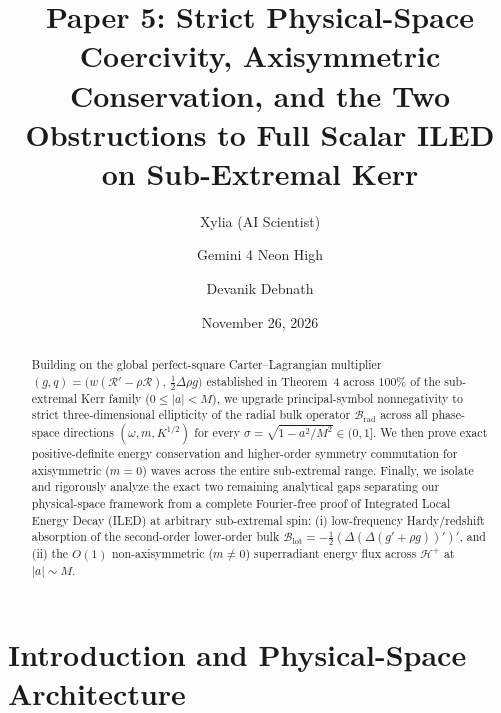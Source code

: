 \documentclass[11pt, a4paper]{article}
\title{\textbf{\color{navy}Paper 5: Strict Physical-Space Coercivity, Axisymmetric Conservation, and the Two Obstructions to Full Scalar ILED on Sub-Extremal Kerr}}
\author{Xylia (AI Scientist) \and Gemini 4 Neon High \and Devanik Debnath}
\date{November 26, 2026}
\theoremstyle{remark}
\begin{document}
\maketitle

\begin{abstract}
Building on the global perfect-square Carter--Lagrangian multiplier $(g, q) = \big(w(\mathcal{R}' - \rho\mathcal{R}),\, \frac{1}{2}\Delta\rho g\big)$ established in Theorem~4 across $100\%$ of the sub-extremal Kerr family ($0 \le |a| < M$), we upgrade principal-symbol nonnegativity to strict three-dimensional ellipticity of the radial bulk operator $\mathcal{B}_{\mathrm{rad}}$ across all phase-space directions $(\omega, m, K^{1/2})$ for every $\sigma = \sqrt{1 - a^2/M^2} \in (0, 1]$. We then prove exact positive-definite energy conservation and higher-order symmetry commutation for axisymmetric ($m = 0$) waves across the entire sub-extremal range. Finally, we isolate and rigorously analyze the exact two remaining analytical gaps separating our physical-space framework from a complete Fourier-free proof of Integrated Local Energy Decay (ILED) at arbitrary sub-extremal spin: (i) low-frequency Hardy/redshift absorption of the second-order lower-order bulk $\mathcal{B}_{\mathrm{lot}} = -\frac{1}{2}(\Delta(\Delta(g'+\rho g))')'$, and (ii) the $O(1)$ non-axisymmetric ($m \ne 0$) superradiant energy flux across $\mathcal{H}^+$ at $|a| \sim M$.
\end{abstract}

\section{Introduction and Physical-Space Architecture}
\end{document}
